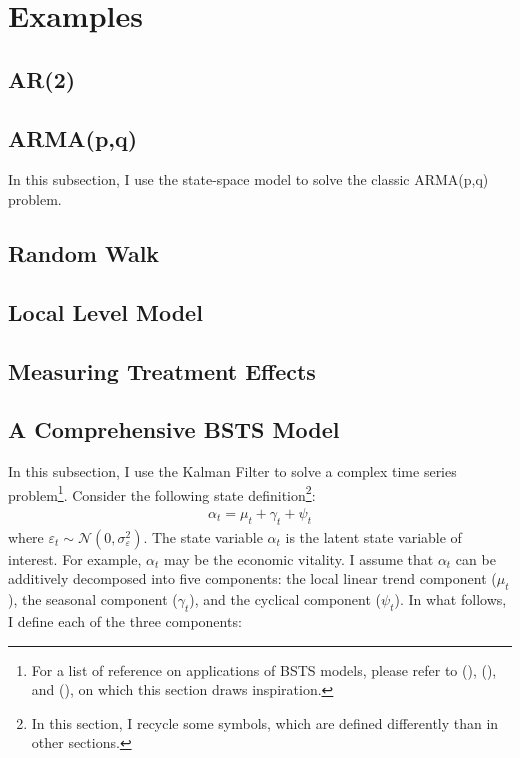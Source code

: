 \documentclass[10pt, titlepage]{article}
\numberwithin{equation}{section}
\begin{document}
\section{Examples} \label{sec:apply}
\subsection{AR(2)}

\subsection{ARMA(p,q)}
In this subsection, I use the state-space model to solve the classic ARMA(p,q) problem.

\subsection{Random Walk}

\subsection{Local Level Model}

\subsection{Measuring Treatment Effects}

\subsection{A Comprehensive BSTS Model}
In this subsection, I use the Kalman Filter to solve a complex time series problem\footnote{For a list of reference on applications of BSTS models, please refer to (\cite{brodersen_etal_2015}), (\cite{harvey_1985}), and (\cite{harvey2007trends}), on which this section draws inspiration.}. Consider the following state definition\footnote{In this section, I recycle some symbols, which are defined differently than in other sections.}:
\begin{align}
    \alpha_t = \mu_t + \gamma_t + \psi_t \label{eq:state_decompose}
\end{align}
where $\varepsilon_t\sim\mathcal{N}(0,\sigma_{\varepsilon}^2)$. The state variable $\alpha_t$ is the latent state variable of interest. For example, $\alpha_t$ may be the economic vitality. I assume that $\alpha_t$ can be additively decomposed into five components: the local linear trend component ($\mu_t$), the seasonal component ($\gamma_t$), and the cyclical component ($\psi_t$). In what follows, I define each of the three components:
\end{document}
